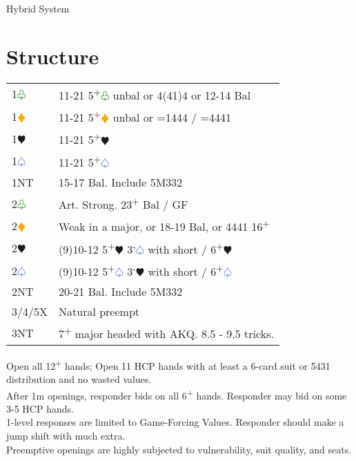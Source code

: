 \documentclass{article}
\renewcommand{\sp}{\textcolor{RoyalBlue}{$\varspade$}}
\newcommand{\he}{\textcolor{RubineRed}{$\varheart$}}
\newcommand{\di}{\textcolor{Orange}{$\vardiamond$}}
\newcommand{\cl}{\textcolor{Green}{$\varclub$}}
\newcommand{\nt}{\relsize{-1}NT\relsize{1}}
\newcommand{\up}{\textsuperscript{+}}
\newcommand{\down}{\textsuperscript{-}}
\begin{document}
\normalfont
\twocolumn
\setlength{\columnseprule}{0.5pt}
\Large{Hybrid System}
\normalsize
\tableofcontents

\vfill\eject

\section{Structure}

\begin{tabular}{|l|p{6.5cm}}
 1\cl{} & 11-21 5\up\cl{} unbal or 4(41)4 or 12-14 Bal \\
 1\di{} & 11-21 5\up\di{} unbal or =1444 / =4441 \\
 1\he{} & 11-21 5\up\he{} \\
 1\sp{} & 11-21 5\up\sp{} \\
 1\nt{} & 15-17 Bal. Include 5M332 \\
 2\cl{} & Art. Strong. 23\up{} Bal / GF \\
 2\di{} & Weak in a major, or 18-19 Bal, or 4441 16\up{} \\
 2\he{} & (9)10-12 5\up\he{} 3\down{}\sp{} with short / 6\up{}\he \\
 2\sp{} & (9)10-12 5\up\sp{} 3\down{}\he{} with short / 6\up{}\sp \\
 2\nt & 20-21 Bal. Include 5M332 \\
 3/4/5X & Natural preempt \\
 3\nt & 7\up{} major headed with AKQ. 8.5 - 9.5 tricks. \\
\end{tabular}

\medskip

Open all 12\up{} hands; Open 11 HCP hands with at least a 6-card suit or 5431 distribution and no wasted values. \\

After 1m openings, responder bids on all 6\up{} hands. Responder may bid on some 3-5 HCP hands. \\

1-level responses are limited to Game-Forcing Values. Responder should make a jump shift with much extra. \\

Preemptive openings are highly subjected to vulnerability, suit quality, and seats.
\end{document}
